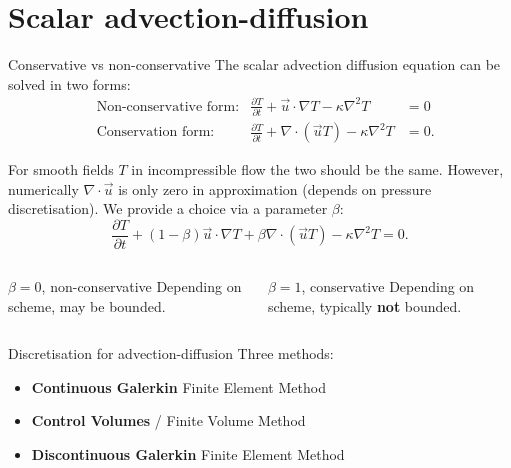 \documentclass[12pt]{beamer}
\newcommand\pp[2]{\frac{\partial #1}{\partial #2}}
\newcommand\ppt[1]{\pp{#1}t}
\newcommand\grad\nabla
\renewcommand\div{\nabla\cdot}
\renewcommand\emph[1]{{\bf #1}}
\begin{document}
\section{Scalar advection-diffusion}
\begin{frame}{Conservative vs non-conservative}
  \small
  The scalar advection diffusion equation can be solved in two
  forms:
  \begin{align*}
    &\text{Non-conservative form:} &
    \ppt T + \vec u\cdot\grad T - \kappa \nabla^2 T &= 0 \\
    &\text{Conservation form:} &
    \ppt T + \div \left(\vec u T\right) - \kappa \nabla^2 T &= 0.
  \end{align*}

  For smooth fields $T$ in incompressible flow the two should be the same. However, numerically
  $\div\vec u$ is only zero in approximation (depends on pressure
  discretisation). We provide a choice via a
  parameter $\beta$:
  \begin{equation*}
    \ppt T + (1-\beta)\vec u\cdot\grad T + \beta \div \left( \vec u T\right)- \kappa \nabla^2 T = 0.
  \end{equation*}

  \vspace{-0.5em}
  \begin{columns}
    \begin{column}{0.5\textwidth}
      \begin{block}{$\beta=0$, non-conservative}
        Depending on scheme, may be bounded.
      \end{block}
    \end{column}%
    \begin{column}{0.5\textwidth}
      \begin{block}{$\beta=1$, conservative}
        Depending on scheme,
        typically \emph{not} bounded.
      \end{block}
    \end{column}
  \end{columns}
\end{frame}

\begin{frame}{Discretisation for advection-diffusion}
  Three methods:
  \begin{itemize}
    \item \emph{Continuous Galerkin} Finite Element Method
    \item \emph{Control Volumes} / Finite Volume Method
    \item \emph{Discontinuous Galerkin} Finite Element Method
  \end{itemize}
\end{frame}
\end{document}
